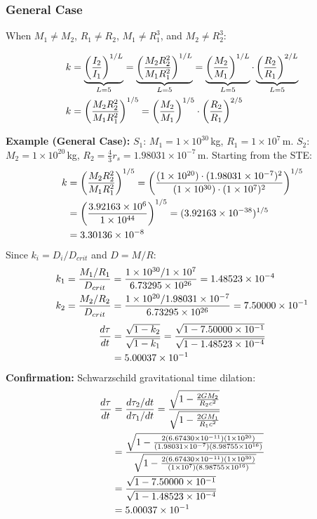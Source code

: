 \subsubsection*{General Case}

When $M_1 \neq M_2$, $R_1 \neq R_2$, $M_1 \neq R_1^3$, and $M_2 \neq R_2^3$:

\begin{align}
k &= \underbrace{\left(\frac{I_2}{I_1}\right)^{1/L}}_{L=5} = \underbrace{\left(\frac{M_2 R_2^2}{M_1 R_1^2}\right)^{1/L}}_{L=5} = \underbrace{\left(\frac{M_2}{M_1}\right)^{1/L}}_{L=5} \cdot \underbrace{\left(\frac{R_2}{R_1}\right)^{2/L}}_{L=5} \notag \\
k &= \left(\frac{M_2 R_2^2}{M_1 R_1^2}\right)^{1/5} = \left(\frac{M_2}{M_1}\right)^{1/5} \cdot \left(\frac{R_2}{R_1}\right)^{2/5}
\end{align}

\begin{mdframed}
\textbf{Example (General Case):} $S_1$: $M_1 = 1 \times 10^{30}$\,kg, $R_1 = 1 \times 10^{7}$\,m. $S_2$: $M_2 = 1 \times 10^{20}$\,kg, $R_2 = \frac{4}{3} r_s = 1.98031 \times 10^{-7}$\,m. Starting from the STE:
\begin{align}
k &= \left(\frac{M_2 R_2^2}{M_1 R_1^2}\right)^{1/5}
= \left(\frac{(1 \times 10^{20}) \cdot (1.98031 \times 10^{-7})^2}{(1 \times 10^{30}) \cdot (1 \times 10^{7})^2}\right)^{1/5} \notag \\
&= \left(\frac{3.92163 \times 10^{6}}{1 \times 10^{44}}\right)^{1/5}
= (3.92163 \times 10^{-38})^{1/5} \notag \\
&= 3.30136 \times 10^{-8} \notag
\end{align}
Since $k_i = D_i/D_{crit}$ and $D = M/R$:
\begin{align}
k_1 &= \frac{M_1/R_1}{D_{crit}}
= \frac{1 \times 10^{30}/1 \times 10^{7}}{6.73295 \times 10^{26}}
= 1.48523 \times 10^{-4} \notag \\
k_2 &= \frac{M_2/R_2}{D_{crit}}
= \frac{1 \times 10^{20}/1.98031 \times 10^{-7}}{6.73295 \times 10^{26}}
= 7.50000 \times 10^{-1} \notag
\end{align}
\begin{align}
\frac{d\tau}{dt} &= \frac{\sqrt{1 - k_2}}{\sqrt{1 - k_1}}
= \frac{\sqrt{1 - 7.50000 \times 10^{-1}}}{\sqrt{1 - 1.48523 \times 10^{-4}}} \notag \\
&= 5.00037 \times 10^{-1} \notag
\end{align}
\textbf{Confirmation:} Schwarzschild gravitational time dilation:
\begin{align}
\frac{d\tau}{dt} &= \frac{d\tau_2 / dt}{d\tau_1 / dt}
= \frac{\sqrt{1 - \frac{2GM_2}{R_2 c^2}}}{\sqrt{1 - \frac{2GM_1}{R_1 c^2}}} \notag \\
&= \frac{\sqrt{1 - \frac{2(6.67430 \times 10^{-11})(1 \times 10^{20})}{(1.98031 \times 10^{-7})(8.98755 \times 10^{16})}}}{\sqrt{1 - \frac{2(6.67430 \times 10^{-11})(1 \times 10^{30})}{(1 \times 10^{7})(8.98755 \times 10^{16})}}} \notag \\
&= \frac{\sqrt{1 - 7.50000 \times 10^{-1}}}{\sqrt{1 - 1.48523 \times 10^{-4}}} \notag \\
&= 5.00037 \times 10^{-1} \notag
\end{align}
\end{mdframed}

